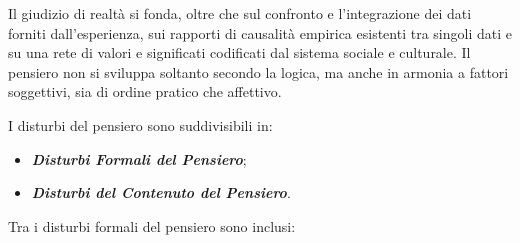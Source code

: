 Il giudizio di realtà si fonda, oltre che sul confronto e l'integrazione
dei dati forniti dall'esperienza, sui rapporti di causalità empirica
esistenti tra singoli dati e su una rete di valori e significati
codificati dal sistema sociale e culturale. Il pensiero non si sviluppa
soltanto secondo la logica, ma anche in armonia a fattori soggettivi,
sia di ordine pratico che affettivo.

I disturbi del pensiero sono suddivisibili in:

\begin{itemize}
\item
  \textbf{\emph{Disturbi Formali del Pensiero}};
\item
  \textbf{\emph{Disturbi del Contenuto del Pensiero}}.
\end{itemize}

Tra i disturbi formali del pensiero sono inclusi:

